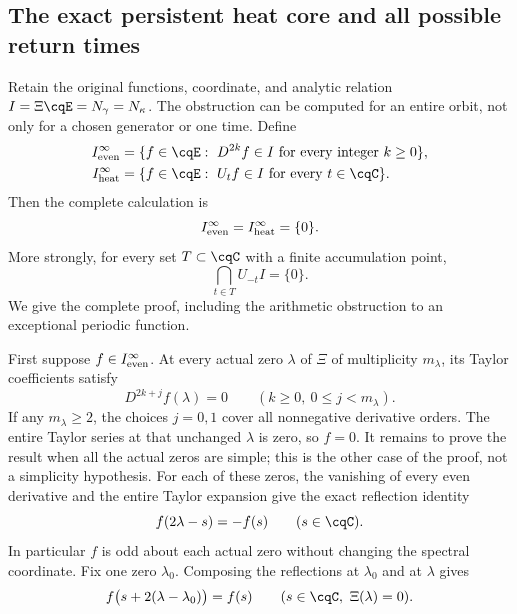 \subsection{The exact persistent heat core and all possible return times}
\label{sec:cq-persistent-heat-core}
Retain the original functions, coordinate, and analytic relation
$I=\Xi\cqE=N_\gamma=N_\kappa$. The obstruction can be computed
for an entire orbit, not only for a chosen generator or one time.
Define
\begin{equation}\label{eq:cq-persistent-cores}
 \begin{aligned}
 I_{\rm even}^{\infty}
   &=\{f\in\cqE:\ D^{2k}f\in I\text{ for every integer }k\geq0\},\\
 I_{\rm heat}^{\infty}
   &=\{f\in\cqE:\ U_tf\in I\text{ for every }t\in\cqC\}.
 \end{aligned}
\end{equation}
Then the complete calculation is
\begin{equation}\label{eq:cq-persistent-core-zero}
 I_{\rm even}^{\infty}=I_{\rm heat}^{\infty}=\{0\}.
\end{equation}
More strongly, for every set $T\subset\cqC$ with a finite
accumulation point,
\begin{equation}\label{eq:cq-accumulating-heat-times}
 \bigcap_{t\in T}U_{-t}I=\{0\}.
\end{equation}
We give the complete proof, including the arithmetic obstruction
to an exceptional periodic function.

First suppose $f\in I_{\rm even}^{\infty}$. At every actual
zero $\lambda$ of $\Xi$ of multiplicity $m_\lambda$, its
Taylor coefficients satisfy
\[
 D^{2k+j}f(\lambda)=0
 \qquad(k\geq0,\ 0\leq j<m_\lambda).
\]
If any $m_\lambda\geq2$, the choices $j=0,1$ cover all
nonnegative derivative orders. The entire Taylor series at that
unchanged $\lambda$ is zero, so $f=0$. It remains to prove
the result when all the actual zeros are simple; this is the
other case of the proof, not a simplicity hypothesis.
For each of these zeros, the vanishing of every even derivative
and the entire Taylor expansion give the exact reflection identity
\begin{equation}\label{eq:cq-heat-core-reflections}
 f(2\lambda-s)=-f(s)\qquad(s\in\cqC).
\end{equation}
In particular $f$ is odd about each actual zero without changing
the spectral coordinate. Fix one zero $\lambda_0$.
Composing the reflections at $\lambda_0$ and at $\lambda$ gives
\begin{equation}\label{eq:cq-heat-core-periods}
 f\bigl(s+2(\lambda-\lambda_0)\bigr)=f(s)
 \qquad(s\in\cqC,\ \Xi(\lambda)=0).
\end{equation}

